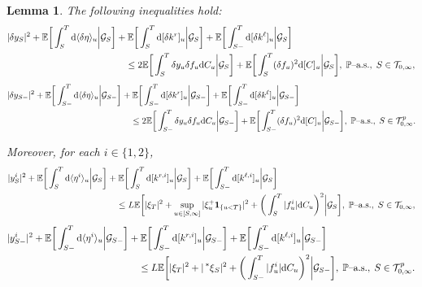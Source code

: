\documentclass[10pt]{article} %
\newtheorem{lemma}[theorem]{Lemma}
\newcommand\cG{\mathcal G}
\newcommand\cT{\mathcal T}
\def \E{\mathbb{E}}
\def \P{\mathbb{P}}
\newcommand{\brs}[1]{\prescript{\ast}{}{#1}}
\newcommand{\1}{\mathbf{1}}
\def\d{\mathrm{d}}
\begin{document}
\begin{lemma}\label{lem::cond_estimates}
	The following inequalities hold:
		\begin{align}\label{eq::cond_deltaeta0}
			|\delta y_S|^2 + \E\bigg[\int_S^T \d\langle\delta\eta\rangle_u \bigg| \cG_S\bigg] &+ \E\bigg[\int_S^T \d[\delta k^r]_u \bigg| \cG_S\bigg] + \E\bigg[\int_{S-}^T \d[\delta k^\ell]_u \bigg| \cG_S\bigg] \nonumber\\
	&\quad \leq 2 \E\bigg[\int_S^T \delta y_u \delta f_u \d C_u \bigg| \cG_S\bigg] + \E\bigg[\int_S^T (\delta f_u)^2\d[C]_u \bigg| \cG_S\bigg],\; \text{$\P$\rm--a.s.}, \; S \in \cT_{0,\infty},
		\end{align}
		\begin{align}\label{eq::cond_deltaeta_pred0}
			|\delta y_{S-}|^2 + \E\bigg[\int_{S-}^T \d\langle\delta\eta\rangle_u \bigg| \cG_{S-}\bigg] &+ \E\bigg[\int_{S-}^T \d[\delta k^r]_u \bigg| \cG_{S-}\bigg] + \E\bigg[\int_{S-}^T \d[\delta k^\ell]_u \bigg| \cG_{S-}\bigg] \nonumber\\
	&\quad \leq 2 \E\bigg[\int_{S-}^T \delta y_u \delta f_u \d C_u \bigg| \cG_{S-}\bigg] + \E\bigg[\int_{S-}^T (\delta f_u)^2\d[C]_u \bigg| \cG_{S-}\bigg],\; \text{$\P$\rm--a.s.}, \; S \in \cT^p_{0,\infty}.
		\end{align}
		
		Moreover, for each $i \in \{1,2\}$,
		\begin{align}\label{eq::cond_eta1}
			 |y^i_S|^2 + \E\bigg[ \int_S^T \d \langle \eta^i \rangle_u \bigg| \cG_S \bigg] &+ \E\bigg[\int_S^T \d[k^{r,i}]_u \bigg| \cG_S\bigg] + \E\bigg[\int_{S-}^T \d[k^{\ell,i}]_u \bigg| \cG_S\bigg] \nonumber\\
			 &\quad\leq L \E\bigg[ |\xi_T|^2 + \sup_{u \in [S,\infty]} |\xi^+_u \mathbf{1}_{\{u < T\}}|^2 + \bigg(\int_S^T |f^i_u| \d C_u\bigg)^2 \bigg| \cG_S \bigg],\; \text{$\P$\rm--a.s.}, \; S \in \cT_{0,\infty},
		\end{align}
		\begin{align}\label{eq::cond_eta1_pred}
			 |y^i_{S-}|^2 + \E\bigg[ \int_{S-}^T \d \langle \eta^i \rangle_u \bigg| \cG_{S-} \bigg] &+ \E\bigg[\int_{S-}^T \d[k^{r,i}]_u \bigg| \cG_{S-}\bigg] + \E\bigg[\int_{S-}^T \d[k^{\ell,i}]_u \bigg| \cG_{S-}\bigg] \nonumber\\
			 &\quad\leq L \E\bigg[ |\xi_T|^2 + |\brs{\xi}_S|^2 + \bigg(\int_{S-}^T |f^i_u| \d C_u\bigg)^2 \bigg| \cG_{S-} \bigg],\; \text{$\P$\rm--a.s.}, \; S \in \cT^p_{0,\infty}.
		\end{align}
\end{lemma}
\end{document}
